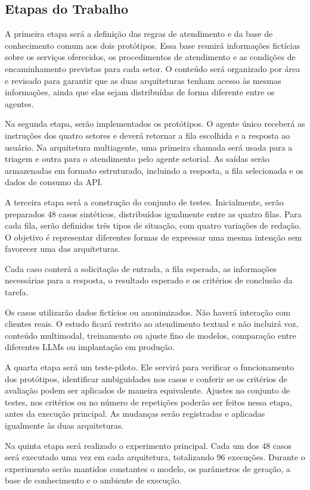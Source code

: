 \documentclass[11pt]{ifscarticle}
\begin{document}
\subsection{Etapas do Trabalho}

A primeira etapa será a definição das regras de atendimento e da base de conhecimento comum aos dois protótipos. Essa base reunirá informações fictícias sobre os serviços oferecidos, os procedimentos de atendimento e as condições de encaminhamento previstas para cada setor. O conteúdo será organizado por área e revisado para garantir que as duas arquiteturas tenham acesso às mesmas informações, ainda que elas sejam distribuídas de forma diferente entre os agentes.

Na segunda etapa, serão implementados os protótipos. O agente único receberá as instruções dos quatro setores e deverá retornar a fila escolhida e a resposta ao usuário. Na arquitetura multiagente, uma primeira chamada será usada para a triagem e outra para o atendimento pelo agente setorial. As saídas serão armazenadas em formato estruturado, incluindo a resposta, a fila selecionada e os dados de consumo da API.

A terceira etapa será a construção do conjunto de testes. Inicialmente, serão preparados 48 casos sintéticos, distribuídos igualmente entre as quatro filas. Para cada fila, serão definidos três tipos de situação, com quatro variações de redação. O objetivo é representar diferentes formas de expressar uma mesma intenção sem favorecer uma das arquiteturas.

Cada caso conterá a solicitação de entrada, a fila esperada, as informações necessárias para a resposta, o resultado esperado e os critérios de conclusão da tarefa.

Os casos utilizarão dados fictícios ou anonimizados. Não haverá interação com clientes reais. O estudo ficará restrito ao atendimento textual e não incluirá voz, conteúdo multimodal, treinamento ou ajuste fino de modelos, comparação entre diferentes LLMs ou implantação em produção.

A quarta etapa será um teste-piloto. Ele servirá para verificar o funcionamento dos protótipos, identificar ambiguidades nos casos e conferir se os critérios de avaliação podem ser aplicados de maneira equivalente. Ajustes no conjunto de testes, nos critérios ou no número de repetições poderão ser feitos nessa etapa, antes da execução principal. As mudanças serão registradas e aplicadas igualmente às duas arquiteturas.

Na quinta etapa será realizado o experimento principal. Cada um dos 48 casos será executado uma vez em cada arquitetura, totalizando 96 execuções. Durante o experimento serão mantidos constantes o modelo, os parâmetros de geração, a base de conhecimento e o ambiente de execução.
\end{document}

